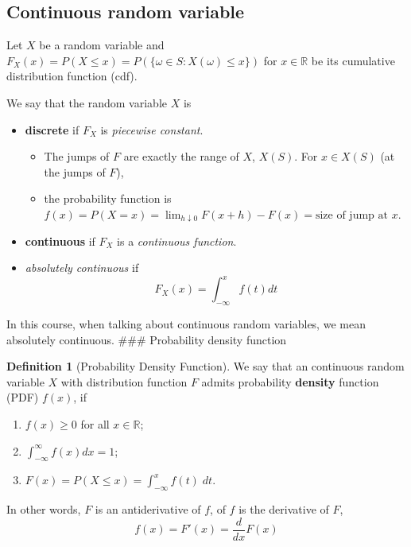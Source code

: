 \documentclass[
]{book}
\providecommand{\tightlist}{%
  \setlength{\itemsep}{0pt}\setlength{\parskip}{0pt}}
\theoremstyle{definition}
\newtheorem{definition}{Definition}[chapter]
\theoremstyle{definition}
\theoremstyle{definition}
\theoremstyle{definition}
\theoremstyle{remark}
\begin{document}
\subsection{Continuous random variable}\label{continuous-random-variable}

Let \(X\) be a random variable and \(F_X(x) = P(X\leq x) = P(\{\omega\in S : X(\omega)\leq x\})\) for \(x\in\mathbb{R}\) be its cumulative distribution function (cdf).

We say that the random variable \(X\) is

\begin{itemize}
\item
  \textbf{discrete} if \(F_X\) is \emph{piecewise constant}.

  \begin{itemize}
  \tightlist
  \item
    The jumps of \(F\) are exactly the range of \(X\), \(X(S)\). For \(x\in X(S)\) (at the jumps of \(F\)),
  \item
    the probability function is \(f(x)=P(X=x)=\lim_{h\downarrow 0} F(x+h)-F(x)=\text{size of jump at $x$}\).
  \end{itemize}
\item
  \textbf{continuous} if \(F_X\) is a \emph{continuous function}.
\item
  \emph{absolutely continuous} if
  \[ F_X(x) = \int_{-\infty}^x f(t) dt\]
\end{itemize}

In this course, when talking about continuous random variables, we mean absolutely continuous.
\#\#\# Probability density function

\begin{definition}[Probability Density Function]
We say that an continuous random variable \(X\) with distribution function \(F\) admits probability \textbf{density} function (PDF) \(f(x)\), if

\begin{enumerate}
\def\labelenumi{\arabic{enumi}.}
\tightlist
\item
  \(f(x)\geq 0\) for all \(x\in\mathbb{R}\);
\item
  \(\int_{-\infty}^\infty f(x)dx = 1\);
\item
  \(F(x)=P(X\leq x)= \int_{-\infty}^x f(t)\;d t\).
\end{enumerate}

In other words, \(F\) is an antiderivative of \(f\), of \(f\) is the derivative of \(F\),
\[ f(x) = F'(x) = \frac{d}{dx} F(x)\]
\end{definition}
\end{document}
